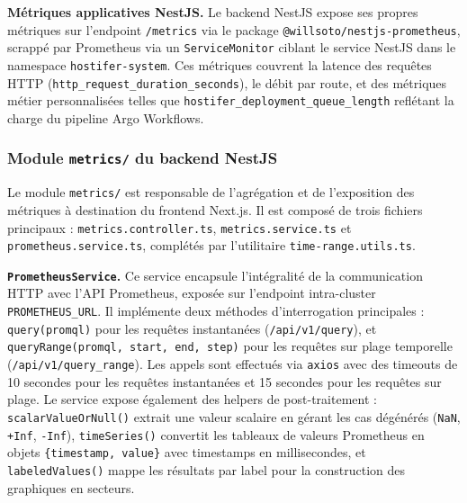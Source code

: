 \textbf{Métriques applicatives NestJS.} Le backend NestJS expose ses propres métriques sur l'endpoint \texttt{/metrics} via le package \texttt{@willsoto/nestjs-prometheus}, scrappé par Prometheus via un \texttt{ServiceMonitor} ciblant le service NestJS dans le namespace \texttt{hostifer-system}. Ces métriques couvrent la latence des requêtes HTTP (\texttt{http\_request\_duration\_seconds}), le débit par route, et des métriques métier personnalisées telles que \texttt{hostifer\_deployment\_queue\_length} reflétant la charge du pipeline Argo Workflows.

\subsubsection*{Module \texttt{metrics/} du backend NestJS}

Le module \texttt{metrics/} est responsable de l'agrégation et de l'exposition des métriques à destination du frontend Next.js. Il est composé de trois fichiers principaux : \texttt{metrics.controller.ts}, \texttt{metrics.service.ts} et \texttt{prometheus.service.ts}, complétés par l'utilitaire \texttt{time-range.utils.ts}.

\textbf{\texttt{PrometheusService}.} Ce service encapsule l'intégralité de la communication HTTP avec l'API Prometheus, exposée sur l'endpoint intra-cluster \texttt{PROMETHEUS\_URL}. Il implémente deux méthodes d'interrogation principales : \texttt{query(promql)} pour les requêtes instantanées (\texttt{/api/v1/query}), et \texttt{queryRange(promql, start, end, step)} pour les requêtes sur plage temporelle (\texttt{/api/v1/query\_range}). Les appels sont effectués via \texttt{axios} avec des timeouts de 10 secondes pour les requêtes instantanées et 15 secondes pour les requêtes sur plage. Le service expose également des helpers de post-traitement : \texttt{scalarValueOrNull()} extrait une valeur scalaire en gérant les cas dégénérés (\texttt{NaN}, \texttt{+Inf}, \texttt{-Inf}), \texttt{timeSeries()} convertit les tableaux de valeurs Prometheus en objets \texttt{\{timestamp, value\}} avec timestamps en millisecondes, et \texttt{labeledValues()} mappe les résultats par label pour la construction des graphiques en secteurs.

